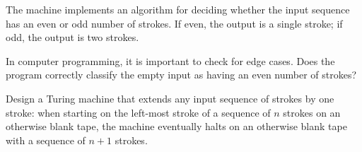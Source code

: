 The machine implements an algorithm for
deciding whether the input sequence has an even or odd number of strokes.
If even, the output is a single stroke;
if odd, the output is two strokes.

%
%
%
%

\begin{exercise}
  In computer programming,
  it is important to check for edge cases.
  Does the program correctly classify the empty input as having an even number of strokes?
\end{exercise}

\begin{exercise}\label{ex:tm-add-stroke}
  Design a Turing machine that extends any input sequence of strokes
  by one stroke:
  when starting on the left-most stroke of a sequence of $n$ strokes
  on an otherwise blank tape,
  the machine eventually halts on an otherwise blank tape with
  a sequence of $n + 1$ strokes.
\end{exercise}

